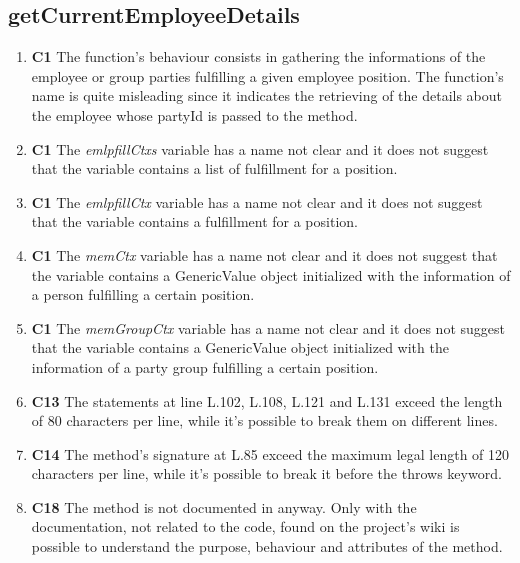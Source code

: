 \subsection{getCurrentEmployeeDetails}


\begin{enumerate}
	\item \textbf{C1} The function's behaviour consists in gathering the informations of the employee or group parties fulfilling a given employee position.
The function's name is quite misleading since it indicates the retrieving of the details about the employee whose partyId is passed to the method.

	\item \textbf{C1} The \textit{emlpfillCtxs} variable has a name not clear and it does not suggest that the variable contains a list of fulfillment for a position.

	\item \textbf{C1} The \textit{emlpfillCtx} variable has a name not clear and it does not suggest that the variable contains a fulfillment for a position.

	\item \textbf{C1} The \textit{memCtx} variable has a name not clear and it does not suggest that the variable contains a GenericValue object initialized with the information of a person fulfilling a certain position.

	\item \textbf{C1} The \textit{memGroupCtx} variable has a name not clear and it does not suggest that the variable contains a GenericValue object initialized with the information of a party group fulfilling a certain position.

	\item \textbf{C13} The statements at line L.102, L.108, L.121 and L.131 exceed the length of 80 characters per line, while it's possible to break them on different lines.

	\item \textbf{C14} The method's signature at L.85 exceed the maximum legal length of 120 characters per line, while it's possible to break it before the throws keyword.

	\item \textbf{C18} The method is not documented in anyway. Only with the documentation, not related to the code, found on the project's wiki is possible to understand the purpose,  behaviour and attributes of the method.


\end{enumerate}
